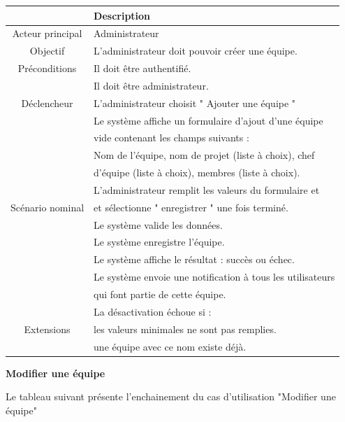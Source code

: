 \begin{center}
\begin{tabular}{|c|l|}
\hline 
&\textbf { Description }\\\hline 
    Acteur principal & Administrateur \\\hline 
    Objectif&L’administrateur doit pouvoir créer une équipe.\\\hline
    Préconditions&Il doit être authentifié.  \\&Il doit être administrateur.\\\hline 
    Déclencheur&L’administrateur choisit " Ajouter une équipe "\\\hline 
    &Le système affiche un formulaire d’ajout d’une équipe     \\&vide contenant les champs suivants :   \\
    &Nom de l’équipe, nom de projet (liste à choix), chef  \\
    &d’équipe (liste à choix), membres (liste à choix).\\
    &L’administrateur remplit les valeurs du formulaire et \\
    Scénario nominal&et sélectionne " enregistrer " une fois terminé.  \\
    &Le système valide les données. \\
    &Le système enregistre l'équipe. \\
    &Le système affiche le résultat : succès ou échec. \\
    &Le système envoie une notification à tous les utilisateurs \\&qui font partie de cette équipe.\\\hline
    &La désactivation échoue si :   \\
    Extensions&les valeurs minimales ne sont pas remplies.   \\
    &une équipe avec ce nom existe déjà.\\\hline
\end{tabular}
\label{desc_ajout_eq}
\end{center}\newpage
\par \textbf{ 	 	Modifier une équipe}
\par Le tableau suivant présente l’enchainement du cas d’utilisation "Modifier une équipe"
